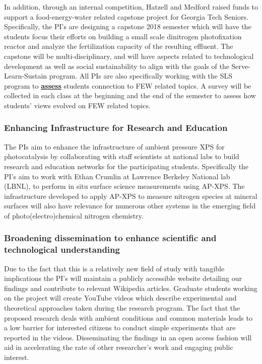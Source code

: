 In addition, through an internal competition, Hatzell and Medford raised funds to support a food-energy-water related capstone project for Georgia Tech Seniors. Specifically, the PI's are designing a capstone 2018 semester which will have the students focus their efforts on building a small scale dinitrogen photofixation reactor and analyze the fertilization capacity of the resulting effluent. The capstone will be multi-disciplinary, and will have aspects related to technological development as well as social sustainability to align with the goals of the Serve-Learn-Sustain program. All PIs are also specifically working with the SLS program to \underline{\textbf{assess}} students connection to FEW related topics. A survey will be collected in each class at the beginning and the end of the semester to assess how students' views evolved on FEW related topics.
\vspace{2mm}

\subsubsection*{\textbf{Enhancing Infrastructure for Research and Education}}
\vspace{2mm}

The PIs aim to enhance the infrastructure of ambient pressure XPS for photocatalysis by collaborating with staff scientists at national labs to build research and education networks for the participating students. Specifically the PI's aim to work with Ethan Crumlin at Lawrence Berkeley National lab (LBNL), to perform in situ surface science measurements using AP-XPS. The infrastructure developed to apply AP-XPS to measure nitrogen species at mineral surfaces will also have relevance for numerous other systems in the emerging field of photo(electro)chemical nitrogen chemistry.

\vspace{2mm}

\subsubsection*{\textbf{Broadening dissemination to enhance scientific and technological understanding}}
\vspace{2mm}

Due to the fact that this is a relatively new field of study with tangible implications the PI's will maintain a publicly accessible website detailing our findings and contribute to relevant Wikipedia articles\cite{wiki_photogeochemistry}. Graduate students working on the project will create YouTube videos which describe experimental and theoretical approaches taken during the research program. The fact that the proposed research deals with ambient conditions and common materials leads to a low barrier for interested citizens to conduct simple experiments that are reported in the videos. Disseminating the findings in an open access fashion will aid in accelerating the rate of other researcher's work and engaging public interest. 
\vspace{2mm}

